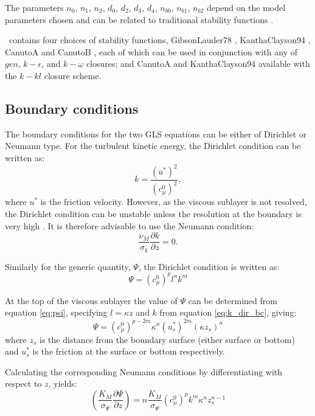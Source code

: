 The parameters $n_0$, $n_1$, $n_2$, $d_0$, $d_2$, $d_3$, $d_4$, $n_{b0}$, $n_{b1}$, $n_{b2}$ depend on
the model parameters chosen and can be related to traditional stability functions \citep{umlauf2005}.

\fluidity\ contains four choices of stability functions, GibsonLauder78 \citep{gibson1978}, KanthaClayson94 \citep{kantha1994}, CanutoA and CanutoB \citep{canuto2001},
each of which can be used in conjunction with any of $gen$, $k-\epsilon$, and $k-\omega$ closures; and CanutoA and KanthaClayson94 available with the $k-kl$ 
closure scheme.

\subsection{Boundary conditions}

The boundary conditions for the two GLS equations can be either of Dirichlet or Neumann
type. For the turbulent kinetic energy, the Dirichlet condition can be written as:
\begin{equation}
k=\frac{\left(u^*\right)^2}{\left(c_\mu^0\right)^2},
\label{eq:k_dir_bc}
\end{equation}
where $u^*$ is the friction velocity. However, as the viscous sublayer is not
resolved, the Dirichlet condition can be unstable unless the resolution at the
boundary is very high \citep{burchard1999}. It is therefore advisable to use
the Neumann condition:
\begin{equation}
\frac{\nu_M}{\sigma_k}\frac{\partial k}{\partial z} = 0.
\end{equation}

Similarly for the generic quantity, $\Psi$, the Dirichlet condition is written
as:
\begin{equation}
\Psi=\left(c_\mu^0\right)^{p}l^nk^m
\end{equation}

At the top of the viscous sublayer the value of $\Psi$ can be determined from equation \ref{eq:psi}, 
specifying $l=\kappa z$ and $k$ from equation \ref{eq:k_dir_bc}, giving:
\begin{equation}
\Psi=\left(c_\mu^0\right)^{p-2m}\kappa^n\left(u_s^*\right)^{2m}\left(\kappa z_s\right)^n
\end{equation}
where $z_s$ is the distance from the boundary surface (either surface or bottom) and $u_s^*$ is the 
friction at the surface or bottom respectively.

Calculating the corresponding Neumann  conditions by differentiating with respect to $z$, yields:
\begin{equation}
\left(\frac{K_M}{\sigma_{\Psi}}\frac{\partial\Psi}{\partial z}\right) = n\frac{K_M}{\sigma_{\Psi}} \left(c_\mu^0\right)^p k^m \kappa^n z_s^{n-1}
\label{eq:psi-flux-bc}
\end{equation}

